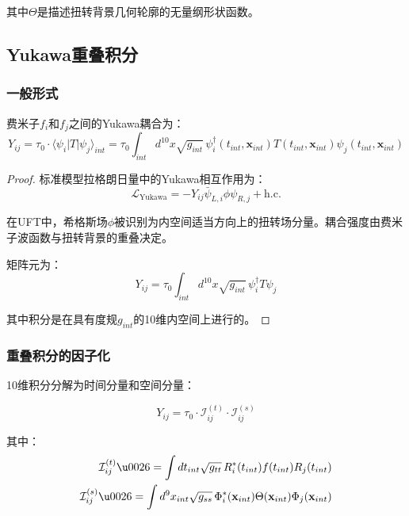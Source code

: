 其中$\Theta$是描述扭转背景几何轮廓的无量纲形状函数。

\subsection{Yukawa重叠积分}

\subsubsection{一般形式}

\begin{theorem}[Yukawa耦合作为重叠积分]
费米子$f_i$和$f_j$之间的Yukawa耦合为：
\begin{equation}
    Y_{ij} = \tau_0 \cdot \langle \psi_i | T | \psi_j \rangle_{int} = \tau_0 \int_{int} d^{10}x \sqrt{g_{int}} \, \psi_i^\dagger(t_{int}, \mathbf{x}_{int}) T(t_{int}, \mathbf{x}_{int}) \psi_j(t_{int}, \mathbf{x}_{int})
\end{equation}
\end{theorem}

\begin{proof}
标准模型拉格朗日量中的Yukawa相互作用为：
\begin{equation}
    \mathcal{L}_{\text{Yukawa}} = -Y_{ij} \bar{\psi}_{L,i} \phi \psi_{R,j} + \text{h.c.}
\end{equation}

在UFT中，希格斯场$\phi$被识别为内空间适当方向上的扭转场分量。耦合强度由费米子波函数与扭转背景的重叠决定。

矩阵元为：
\begin{equation}
    Y_{ij} = \tau_0 \int_{int} d^{10}x \sqrt{g_{int}} \, \psi_i^\dagger T \psi_j
\end{equation}

其中积分是在具有度规$g_{int}$的10维内空间上进行的。
\end{proof}

\subsubsection{重叠积分的因子化}

10维积分分解为时间分量和空间分量：

\begin{equation}
    Y_{ij} = \tau_0 \cdot \mathcal{I}_{ij}^{(t)} \cdot \mathcal{I}_{ij}^{(s)}
\end{equation}

其中：
\begin{align}
    \mathcal{I}_{ij}^{(t)} \u0026= \int dt_{int} \sqrt{g_{tt}} \, R_i^*(t_{int}) f(t_{int}) R_j(t_{int}) \\
    \mathcal{I}_{ij}^{(s)} \u0026= \int d^9x_{int} \sqrt{g_{ss}} \, \Phi_i^*(\mathbf{x}_{int}) \Theta(\mathbf{x}_{int}) \Phi_j(\mathbf{x}_{int})
\end{align}

